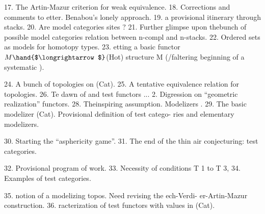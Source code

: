 17.  The Artin-Mazur  criterion for weak equivalence.
18.  Corrections and comments to etter.  Benabou's lonely approach.
19.   a provisional itinerary \hand{(}through stacks\hand{)}. \margin{\rule{2cm}{0.4pt}}
20.  Are model categories sites ?
21.  Further glimpse upon thebunch of possible model categories\hand{;} 
relation between n-compl and n-stacks.
22.  Ordered sets as models for homotopy types.
\margin{$\bigcirc$}23.  etting a basic functor  $M \hand{$\longrightarrow$}$(Hot)    structure M
(/faltering beginning of a systematic ). \margin{\rule{2cm}{0.4pt}}

24.  A bunch of topologies on (Cat).
25.  A tentative equivalence relation for topologies.
26.  Te dawn of   and test functors ...
2.  Digression on ``geometric realization'' functors. \margin{\rule{2cm}{0.4pt}}
\margin{$\bigcirc$}28.  Theinspiring assumption.  Modelizers .
29.  The basic modelizer (Cat).  Provisional definition of test catego-%
ries and elementary modelizers. \margin{\rule{2cm}{0.4pt}}

30.  Starting  the ``asphericity game''.
\margin{$\bigcirc$}31.  The end of the thin air conjecturing:   test
categories. \margin{\rule{2cm}{0.4pt}}

\margin{$\downarrow$}32.  Provisional program of work.
\margin{$\bigcirc$}33.  Necessity of conditions T 1 to T 3, 
34.  Examples of test categories. \margin{\rule{2cm}{0.4pt}}

35.   notion of a modelizing topos.   Need revising the ech-Verdi-%
er-Artin-Mazur construction.
36.  racterization of test functors with values in (Cat). \margin{\rule{2cm}{0.4pt}}

